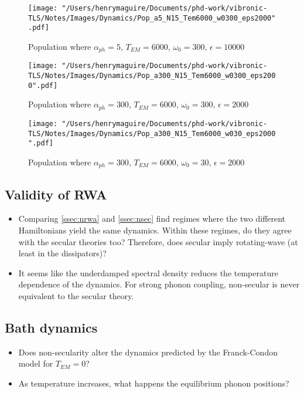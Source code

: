 \documentclass[]{article}
\begin{document}
\begin{figure}[h]
	\centering
	\texttt{[image: "/Users/henrymaguire/Documents/phd-work/vibronic-TLS/Notes/Images/Dynamics/Pop\_a5\_N15\_Tem6000\_w0300\_eps2000".pdf]}
	\caption{Population where $\alpha_{ph}=5$, $T_{EM} =6000$, $\omega_0 = 300$, $\epsilon=10000$}
	\label{}
\end{figure}
\begin{figure}[h]
	\centering
	\texttt{[image: "/Users/henrymaguire/Documents/phd-work/vibronic-TLS/Notes/Images/Dynamics/Pop\_a300\_N15\_Tem6000\_w0300\_eps2000".pdf]}
	\caption{Population where $\alpha_{ph}=300$, $T_{EM} =6000$, $\omega_0 = 300$, $\epsilon=2000$}
	\label{}
\end{figure}
\begin{figure}[h]
	\centering
	\texttt{[image: "/Users/henrymaguire/Documents/phd-work/vibronic-TLS/Notes/Images/Dynamics/Pop\_a300\_N15\_Tem6000\_w030\_eps2000".pdf]}
	\caption{Population where $\alpha_{ph}=300$, $T_{EM} =6000$, $\omega_0 = 30$, $\epsilon=2000$}
	\label{}
\end{figure}
\subsection{Validity of RWA}
\begin{itemize}
	\item Comparing \ref{ssec:nrwa} and \ref{ssec:nsec} find regimes where the two different Hamiltonians yield the same dynamics. Within these regimes, do they agree with the secular theories too? Therefore, does secular imply rotating-wave (at least in the dissipators)?
	\item It seems like the underdamped spectral density reduces the temperature dependence of the dynamics. For strong phonon coupling, non-secular is never equivalent to the secular theory.
\end{itemize}
\subsection{Bath dynamics}
\begin{itemize}
	\item Does non-secularity alter the dynamics predicted by the Franck-Condon model for $T_{EM}=0$?
	\item As temperature increases, what happens the equilibrium phonon positions?
\end{itemize}



\end{document}
